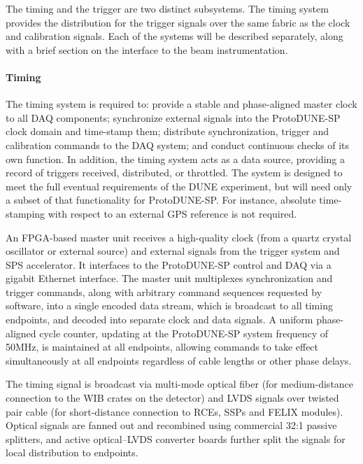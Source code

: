 The timing and the trigger are two distinct subsystems.  The timing
system provides the distribution for the trigger signals over the same
fabric as the clock and calibration signals.  Each of the systems will
be described separately, along with a brief section on the interface to
the beam instrumentation.

\paragraph{Timing}


The timing system is required to: provide a stable and phase-aligned
master clock to all DAQ components; synchronize external signals into the
ProtoDUNE-SP clock domain and time-stamp them; distribute synchronization,
trigger and calibration commands to the DAQ system; and conduct continuous
checks of its own function. In addition, the timing system acts as a
data source, providing a record of triggers received, distributed, or
throttled. The system is designed to meet the full eventual requirements
of the DUNE experiment, but will need only a subset of that functionality
for ProtoDUNE-SP. For instance, absolute time-stamping with respect to an
external GPS reference is not required.

An FPGA-based master unit receives a high-quality clock (from a quartz crystal oscillator or external source) 
and external signals from the
trigger system and SPS accelerator. It interfaces to the ProtoDUNE-SP control
and DAQ via a gigabit Ethernet interface. The master unit multiplexes
synchronization and trigger commands, along with arbitrary command
sequences requested by software, into a single encoded data stream,
which is broadcast to all timing endpoints, and decoded into separate clock
and data signals. A uniform phase-aligned cycle counter, updating at the
ProtoDUNE-SP system frequency of 50MHz, is maintained at all endpoints,
allowing commands to take effect simultaneously at all endpoints
regardless of cable lengths or other phase delays.

The timing signal is broadcast via multi-mode optical fiber (for
medium-distance connection to the WIB crates on the detector) and LVDS
signals over twisted pair cable (for short-distance connection to RCEs,
SSPs and FELIX modules). Optical signals are fanned out and recombined
using commercial 32:1 passive splitters, and active optical--LVDS
converter boards further split the signals for local distribution to
endpoints. 

